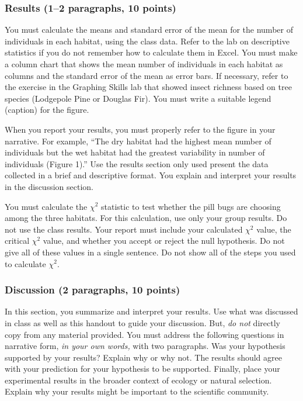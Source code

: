 \documentclass[12pt, hidelinks]{exam}
\newcommand\chisq{$\chi^2$}
\begin{document}
\subsubsection*{Results (1–2 paragraphs, 10 points)}

You must calculate the means and standard error of the mean for the number of individuals in each habitat, using the class data. Refer to the lab on descriptive statistics if you do not remember how to calculate them in Excel. You must make a column chart that shows the mean number of individuals in each habitat as columns and the standard error of the mean as error bars. If necessary, refer to the exercise in the Graphing Skills lab that showed insect richness based on tree species (Lodgepole Pine or Douglas Fir). You must write a suitable legend (caption) for the figure. 

When you report your results, you must properly refer to the figure in your narrative. For example, ``The dry habitat had the highest mean number of individuals but the wet habitat had the greatest variability in number of individuals (Figure 1).'' Use the results section only used  present the data collected in a brief and
descriptive format. You explain and interpret your results in the discussion section.   

You must calculate the \chisq{} statistic to test whether the pill bugs are choosing among the three habitats. For this calculation, use only your group results. Do not use the class results. Your report must include your calculated \chisq{} value, the critical \chisq{} value, and whether you accept or reject the null hypothesis. Do not give all of these values in a single sentence. Do not show all of the steps you used to calculate \chisq{}. 


\subsubsection*{Discussion (2 paragraphs, 10 points)} 

In this section, you summarize and interpret your results. Use what
was discussed in class as well as this handout to guide
your discussion. But, \emph{do not} directly copy from any material provided.
You must address the following questions in narrative form, \emph{in your own words,} with two
paragraphs. Was your hypothesis supported by your results? Explain why or why not. 
The results should agree with your prediction for your hypothesis to be supported. 
Finally, place your experimental results in the broader context of ecology or natural
selection. Explain why your results might be important to the
scientific community.
\end{document}
